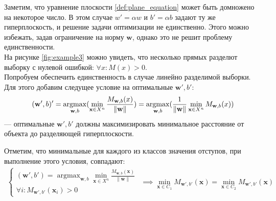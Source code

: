 \documentclass[%
bachelor,    %
subf,        %
href,        %
colorlinks,  %
]{disser}
\let\vec=\mathbf
\DeclareMathOperator*{\argmax}{argmax}
\begin{document}
Заметим, что уравнение плоскости \ref{def:plane_equation} может быть домножено на некоторое число. В этом случае $w'= \alpha w$ и $b' = \alpha b$ задают ту же гиперплоскость, и решение задачи оптимизации не единственно. Этого можно избежать, задав ограничение на норму $\vec{w}$, однако это не решит проблему единственности.\\
На рисунке \ref{fig:example3} можно увидеть, что несколько прямых разделют выборку с нулевой ошибкой: $\forall x: M(x)>0.$\\
Попробуем обеспечить единственность в случае линейно разделимой выборки. Для этого добавим следущее условие на оптимальные $\vec{w'},b'$:
$$(\vec{w'},b)'  =\argmax_{\vec{w},b} (\min_{\vec{x} \in X^n} \frac{M_{\vec{w},b}(x)}{\|\vec{w}\|}) \\
=\argmax_{\vec{w},b} (\frac{1}{\|\vec{w}\|}\min_{\vec{x} \in X^n} M_{\vec{w},b}(x)) $$
---  оптимальные $\vec{w'},b'$ должны максимизировать минимальное расстояние от объекта до разделяющей гиперплоскости.

Отметим, что минимальные для каждого из классов значения отступов, при выполнение этого условия, совпадают:
\begin{equation*}
\begin{gathered}
\begin{cases}
(\vec{w'},b')  =\argmax_{\vec{w},b} \min_{\vec{x} \in X^n} \frac{ M_{\vec{w},b}(\vec{x})}{\|\vec{w}\|}\\
\forall i : M_{\vec{w}',b'}(\vec{x}_i)>0
\end{cases}
\end{gathered}
\implies
\min_{\vec{x} \in C_1} M_{\vec{w}',b'}(\vec{x}) = \min_{\vec{x} \in C_2} M_{\vec{w}',b'}(\vec{x})
\end{equation*}
\end{document}
